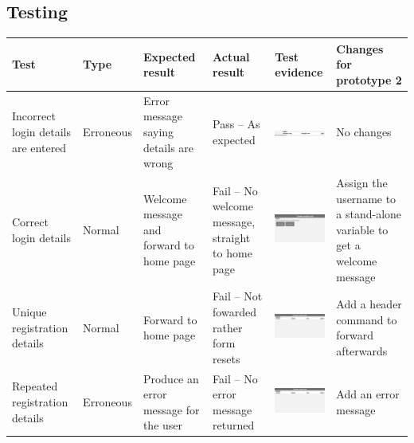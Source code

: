 \subsection{Testing}
\begin{center}
\begin{longtable}{|P{17mm}|P{17mm}|P{16mm}|P{17mm}|P{40mm}|P{21.5mm}|}
  \hline
  \textbf{Test} & \textbf{Type} & \textbf{Expected result} & \textbf{Actual result} & \textbf{Test evidence} & \textbf{Changes for prototype 2}\\
  \hline
  \endfirsthead
  \hline
  \endhead
  \hline 

  \endfoot
  \endlastfoot

Incorrect login details are entered & Erroneous & Error message saying
details are wrong & Pass -- As expected &
\includegraphics[width=38mm]{ch3_developing/proto1/media/image2.png}
& No changes \\ \hline
Correct login details & Normal & Welcome message and forward to home
page & Fail -- No welcome message, straight to home page &
\includegraphics[width=38mm]{ch3_developing/proto1/media/image3.png}
& Assign the username to a stand-alone variable to get a welcome
message \\ \hline
Unique registration details & Normal & Forward to home page & Fail --
Not fowarded rather form resets &
\includegraphics[width=38mm]{ch3_developing/proto1/media/image4.png}
& Add a header command to forward afterwards \\ \hline
Repeated registration details & Erroneous & Produce an error message for
the user & Fail -- No error message returned &
\includegraphics[width=38mm]{ch3_developing/proto1/media/image4.png}
& Add an error message \\ \hline

\end{longtable}
\end{center}
